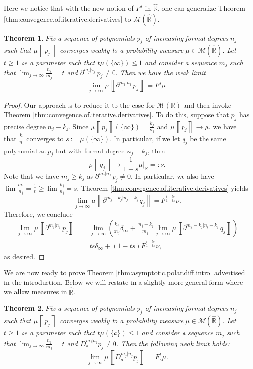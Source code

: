 \documentclass[reqno,11pt]{amsart}
\newtheorem{theorem}{Theorem}[section]
\theoremstyle{remark}
\newcommand{\rr}{\mathbb{R}}
\newcommand{\MM}{\mathcal{M}}
\newcommand{\diff}[2]{\partial^{#1|#2}\, }  %
\newcommand{\polars}[3]{D_{#1}^{#2|#3}}
\newcommand{\freepower}[1]{F^{#1}}
\newcommand{\pfreepower}[2]{F_{#1}^{#2}}
\newcommand{\meas}[1]{\mu \left\llbracket #1 \right\rrbracket}
\begin{document}
Here we notice that with the new notion of $\freepower{s}$ in $\hat{\rr}$, one can generalize Theorem \ref{thm:convegence.of.iterative.derivatives} to $\MM(\hat{\rr})$.
\begin{theorem}\label{thm:generalized.convegence.of.iterative.derivatives}
    Fix a sequence of polynomials $p_j$ of increasing formal degrees $n_j$ such that $\meas{p_j}$ converges weakly to a probability measure $\mu \in \MM(\hat{\rr})$. Let $t\geq 1$ be a parameter such that $ t\mu(\{\infty\})\leq 1 $ and consider a sequence $m_j$ such that $\lim_{j\to\infty}\frac{n_j}{m_j}=t$ and $ \diff{m_j}{n_j} p_j\neq 0 $. Then
we have the weak limit
$$\lim_{j\to\infty} \meas{\diff{m_j}{n_j} p_j}=  \freepower{s}\mu.$$
\end{theorem}
\begin{proof}
Our approach is to reduce it to the case for $\MM({\rr})$ and then invoke Theorem \ref{thm:convegence.of.iterative.derivatives}. To do this, suppose that $p_j$ has precise degree $n_j-k_j$. Since $\meas{p_j}(\{\infty\}) = \frac{k_j}{n_j}$ and $ \meas{p_j}\to \mu $, we have that $ \frac{k_j}{n_j}$ converges to $s:= \mu(\{\infty\}) $. In particular, if we let $q_j$ be the same polynomial as $p_j$ but with formal degree $n_j-k_j$, then 
    $$ \meas{q_j} \to \frac{1}{1-s} \mu|_{ \rr }=:\nu. $$
    Note that we have $ m_j\geq k_j $ as $  \diff{m_j}{n_j} p_j \neq 0$. In particular, we also have $\lim \frac{m_j}{n_j} = \frac{1}{t}\geq \lim \frac{k_j}{n_j} = s  $. Theorem \ref{thm:convegence.of.iterative.derivatives} yields
    $$ \lim_{j\to \infty }\meas{ \diff{m_j-k_j}{n_j-k_j} q_j} = \freepower{\frac{t-ts}{1-ts}}\nu. $$
    Therefore, we conclude
    \begin{align*}
        \lim_{j\to\infty} \meas{\diff{m_j}{n_j} p_j} &= \lim_{j\to\infty} \left( \frac{ k_j}{m_j}\delta_\infty + \frac{m_j-k_j}{m_j} \lim_{j\to \infty }\meas{ \diff{m_j-k_j}{n_j-k_j} q_j}  \right)\\
        &= ts\delta_\infty + (1-ts)\freepower{\frac{t-ts}{1-ts}}\nu,
    \end{align*} 
as desired.
\end{proof}

We are now ready to prove  
Theorem \ref{thm:asymptotic.polar.diff.intro} advertised in the introduction. Below we will restate in a slightly more general form where we allow measures in $\hat{\rr}$.

\begin{theorem}
\label{thm:asymptotic.polar.diff}
Fix a sequence of polynomials $p_j$ of increasing formal degrees $n_j$ such that $\meas{p_j}$ converges weakly to a probability measure $\mu \in \MM(\hat{\rr})$. Let $t\geq 1$ be a parameter such that $t \mu(\{a\})\leq 1$ and consider a sequence $m_j$ such that $\lim_{j\to\infty}\frac{n_j}{m_j}=t$ and $ \polars{a}{m_j}{n_j} p_j\neq 0 $. Then the following weak limit holds:
$$\lim_{j\to\infty} \meas{\polars{a}{m_j}{n_j} p_j}=  \pfreepower{a}{t}\mu.$$
\end{theorem}
\end{document}
